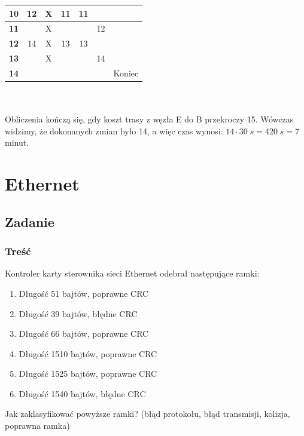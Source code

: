 \begin{tabular}{|c|c|c|c|c|c|p{7cm}|}
				\hline \textbf{10} & 12 & X & 11 & 11 & \color{red}{12} &  \\ 
				\hline \textbf{11} & \color{red}{14} & X & \color{red}{13} & \color{red}{13} & 12 &  \\ 
				\hline \textbf{12} & 14 & X & 13 & 13 & \color{red}{14} &  \\ 
				\hline \textbf{13} & \color{red}{16} & X & \color{red}{15} & \color{red}{15} & 14 &  \\ 
				\hline \textbf{14} &  &  &  &  & \color{red}{16} & Koniec \\ 
				\hline 
			\end{tabular}\\\\
			Obliczenia kończą się, gdy koszt trasy z węzła E do B przekroczy 15. Wówczas widzimy, że dokonanych zmian było 14, a więc czas wynosi: $ 14\cdot 30\;s=420\;s=7$ minut.

\section{Ethernet}
	\subsection{Zadanie}
		\subsubsection{Treść}
			Kontroler karty sterownika sieci Ethernet odebrał następujące ramki:
			\begin{enumerate}
				\item Długość 51 bajtów, poprawne CRC
				\item Długość 39 bajtów, błędne CRC
				\item Długość 66 bajtów, poprawne CRC
				\item Długość 1510 bajtów, poprawne CRC
				\item Długość 1525 bajtów, poprawne CRC
				\item Długość 1540 bajtów, błędne CRC
			\end{enumerate}
			Jak zaklasyfikować powyższe ramki? (błąd protokołu, błąd transmisji, kolizja, poprawna ramka)

